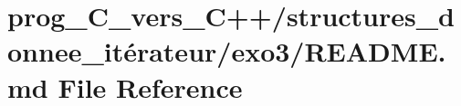 \hypertarget{prog__C__vers__C_09_09_2structures__donnee__it_xC3_xA9rateur_2exo3_2README_8md}{}\section{prog\+\_\+\+C\+\_\+vers\+\_\+\+C++/structures\+\_\+donnee\+\_\+itérateur/exo3/\+R\+E\+A\+D\+ME.md File Reference}
\label{prog__C__vers__C_09_09_2structures__donnee__it_xC3_xA9rateur_2exo3_2README_8md}
